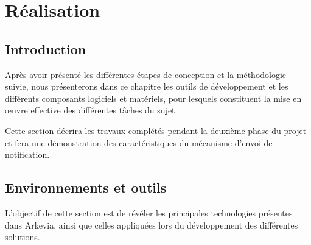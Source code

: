 \section{Réalisation}

\subsection*{Introduction}

Après avoir présenté les différentes étapes de conception et la méthodologie suivie, nous présenterons dans ce chapitre les outils de développement et les différents composants logiciels et matériels, pour lesquels constituent la mise en œuvre effective des différentes tâches du sujet.


Cette section décrira les travaux complétés pendant la deuxième phase du projet et fera une démonstration des caractéristiques du mécanisme d'envoi de notification.
\subsection{Environnements et outils}
L'objectif de cette section est de révéler les principales technologies présentes dans Arkevia, ainsi que celles appliquées lors du développement des différentes solutions. 
